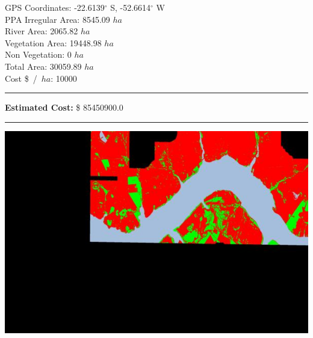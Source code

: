 \documentclass{article}
\begin{document}
    \begin{minipage}{0.5\linewidth}

    GPS Coordinates: -22.6139$^{\circ}$ S, -52.6614$^{\circ}$ W    \\
    PPA Irregular Area: 8545.09 $ha$  \\
    River Area: 2065.82 $ha$              \\
    Vegetation Area: 19448.98 $ha$           \\
    Non Vegetation: 0 $ha$           \\
    Total Area: 30059.89 $ha$              \\
    Cost \$~/~$ha$: 10000               \\
    \rule{\linewidth}{1pt}
    \textbf{Estimated Cost:} \$ 85450900.0           \\
    \rule{\linewidth}{1pt}

    \end{minipage}\hfil
    \begin{minipage}{0.5\linewidth}
        \includegraphics[width=\linewidth]{temp/map3.jpg}
    \end{minipage}
    
    

    \pagebreak
\end{document}
